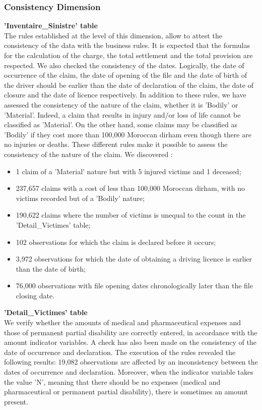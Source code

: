 \subsubsection{Consistency Dimension}
\textbf{'Inventaire\_Sinistre' table}\\
The rules established at the level of this dimension, allow to attest the consistency of the data with the business rules. It is expected that the formulas for the calculation of the charge, the total settlement and the total provision are respected. We also checked the consistency of the dates. Logically, the date of occurrence of the claim, the date of opening of the file and the date of birth of the driver should be earlier than the date of declaration of the claim, the date of closure and the date of licence respectively. In addition to these rules, we have assessed the consistency of the nature of the claim, whether it is 'Bodily' or 'Material'. Indeed, a claim that results in injury and/or loss of life cannot be classified as 'Material'. On the other hand, some claims may be classified as 'Bodily' if they cost more than 100,000 Moroccan dirham even though there are no injuries or deaths. These different rules make it possible to assess the consistency of the nature of the claim. We discovered : 
\begin{itemize}[parsep=0cm,itemsep=0cm] 
    \item 1 claim of a 'Material' nature but with 5 injured victims and 1 deceased;
    \item 237,657 claims with a cost of less than 100,000 Moroccan dirham, with no victims recorded but of a 'Bodily' nature;
    \item 190,622 claims where the number of victims is unequal to the count in the 'Detail\_Victimes' table;
    \item 102 observations for which the claim is declared before it occurs;
    \item 3,972 observations for which the date of obtaining a driving licence is earlier than the date of birth;
    \item 76,000 observations with file opening dates chronologically later than the file closing date.
\end{itemize}
\textbf{'Detail\_Victimes' table}\\
We verify whether the amounts of medical and pharmaceutical expenses and those of permanent partial disability are correctly entered, in accordance with the amount indicator variables. A check has also been made on the consistency of the date of occurrence and declaration. The execution of the rules revealed the following results: 19,082 observations are affected by an inconsistency between the dates of occurrence and declaration. Moreover, when the indicator variable takes the value 'N', meaning that there should be no expenses (medical and pharmaceutical or permanent partial disability), there is sometimes an amount present.

